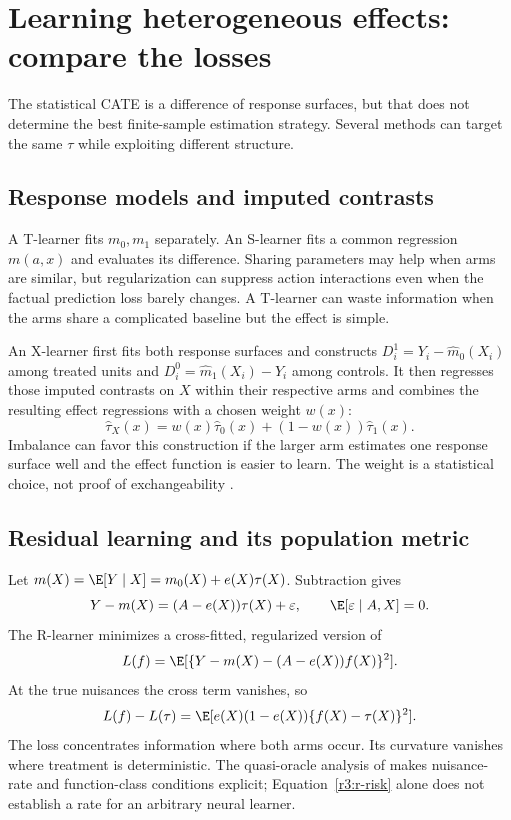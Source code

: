 \section{Learning heterogeneous effects: compare the losses}
\label{r3:heterogeneity}
The statistical CATE is a difference of response surfaces, but that does
not determine the best finite-sample estimation strategy. Several methods
can target the same $\tau$ while exploiting different structure.

\subsection{Response models and imputed contrasts}
A T-learner fits $m_0,m_1$ separately. An S-learner fits a common
regression $m(a,x)$ and evaluates its difference. Sharing parameters may
help when arms are similar, but regularization can suppress action
interactions even when the factual prediction loss barely changes. A
T-learner can waste information when the arms share a complicated
baseline but the effect is simple.

An X-learner first fits both response surfaces and constructs
$D_i^1=Y_i-\widehat m_0(X_i)$ among treated units and
$D_i^0=\widehat m_1(X_i)-Y_i$ among controls. It then regresses those
imputed contrasts on $X$ within their respective arms and combines the
resulting effect regressions with a chosen weight $w(x)$:
\[
 \widehat\tau_X(x)=w(x)\widehat\tau_0(x)
                         +(1-w(x))\widehat\tau_1(x).
\]
Imbalance can favor this construction if the larger arm estimates one
response surface well and the effect function is easier to learn. The
weight is a statistical choice, not proof of exchangeability
\citep[Section on the X-learner]{kunzel2019}.

\subsection{Residual learning and its population metric}
Let $m(X)=\E[Y\mid X]=m_0(X)+e(X)\tau(X)$. Subtraction gives
\begin{equation}
 Y-m(X)=(A-e(X))\tau(X)+\varepsilon,
 \qquad \E[\varepsilon\mid A,X]=0.
 \label{r3:robinson}
\end{equation}
The R-learner minimizes a cross-fitted, regularized version of
\[
 L(f)=\E[\{Y-m(X)-(A-e(X))f(X)\}^2].
\]
At the true nuisances the cross term vanishes, so
\begin{equation}
 L(f)-L(\tau)=\E[e(X)(1-e(X))\{f(X)-\tau(X)\}^2].
 \label{r3:r-risk}
\end{equation}
The loss concentrates information where both arms occur. Its curvature
vanishes where treatment is deterministic. The quasi-oracle analysis of
\citet[Sections 2 and 5]{rlearner2020} makes nuisance-rate and
function-class conditions explicit; Equation~\eqref{r3:r-risk} alone
does not establish a rate for an arbitrary neural learner.

